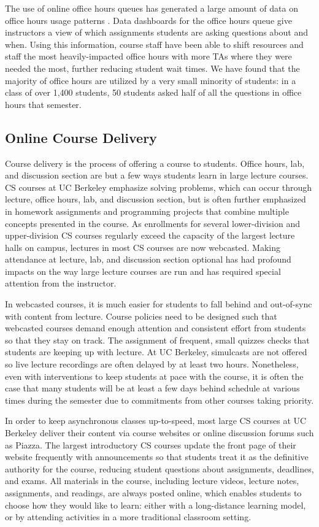 The use of online office hours queues has generated a large amount of data on office hours usage patterns \cite{Smith:2017}. Data dashboards for the office hours queue give instructors a view of which assignments students are asking questions about and when. Using this information, course staff have been able to shift resources and staff the most heavily-impacted office hours with more TAs where they were needed the most, further reducing student wait times. We have found that the majority of office hours are utilized by a very small minority of students: in a class of over 1,400 students, 50 students asked half of all the questions in office hours that semester.

\subsection{Online Course Delivery}

Course delivery is the process of offering a course to students. Office hours, lab, and discussion section are but a few ways students learn in large lecture courses. CS courses at UC Berkeley emphasize solving problems, which can occur through lecture, office hours, lab, and discussion section, but is often further emphasized in homework assignments and programming projects that combine multiple concepts presented in the course. As enrollments for several lower-division and upper-division CS courses regularly exceed the capacity of the largest lecture halls on campus, lectures in most CS courses are now webcasted. Making attendance at lecture, lab, and discussion section optional has had profound impacts on the way large lecture courses are run and has required special attention from the instructor.

In webcasted courses, it is much easier for students to fall behind and out-of-sync with content from lecture. Course policies need to be designed such that webcasted courses demand enough attention and consistent effort from students so that they stay on track. The assignment of frequent, small quizzes checks that students are keeping up with lecture. At UC Berkeley, simulcasts are not offered so live lecture recordings are often delayed by at least two hours. Nonetheless, even with interventions to keep students at pace with the course, it is often the case that many students will be at least a few days behind schedule at various times during the semester due to commitments from other courses taking priority.

In order to keep asynchronous classes up-to-speed, most large CS courses at UC Berkeley deliver their content via course websites or online discussion forums such as Piazza. The largest introductory CS courses update the front page of their website frequently with announcements so that students treat it as the definitive authority for the course, reducing student questions about assignments, deadlines, and exams. All materials in the course, including lecture videos, lecture notes, assignments, and readings, are always posted online, which enables students to choose how they would like to learn: either with a long-distance learning model, or by attending activities in a more traditional classroom setting.

